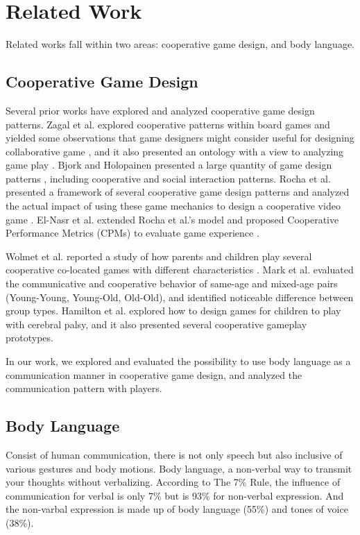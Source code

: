 \chapter{Related Work}
\label{c:related work}

Related works fall within two areas: cooperative game design, and body language.

\section{Cooperative Game Design}

Several prior works have explored and analyzed cooperative game design patterns. Zagal et al. explored cooperative patterns within board games and yielded some observations that game designers might consider useful for designing collaborative game \cite{CG1}, and it also presented an ontology with a view to analyzing game play \cite{CG3}. 
Bjork and Holopainen presented a large quantity of game design patterns \cite{CG2}, including cooperative and social interaction patterns.
Rocha et al. presented a framework of several cooperative game design patterns and analyzed the actual impact of using these game mechanics to design a cooperative video game \cite{CG4}.
El-Nasr et al. extended Rocha et al.'s model and proposed Cooperative Performance Metrics (CPMs) to evaluate game experience \cite{CPMs}.

Wolmet et al. reported a study of how parents and children play several cooperative co-located games with different characteristics \cite{CG5}. 
Mark et al. \cite{CG6} evaluated the communicative and cooperative behavior of same-age and mixed-age pairs (Young-Young, Young-Old, Old-Old), and identified noticeable difference between group types. 
Hamilton et al. \cite{CG7} explored how to design games for children to play with cerebral palsy, and it also presented several cooperative gameplay prototypes.

In our work, we explored and evaluated the possibility to use body language as a communication manner in cooperative game design, and analyzed the communication pattern with players.

\section{Body Language}

Consist of human communication, there is not only speech but also inclusive of various gestures and body motions. Body language, a non-verbal way to transmit your thoughts without verbalizing. According to The 7\% Rule\cite{GD2}, the influence of communication for verbal is only 7\% but is 93\% for non-verbal expression. And the non-varbal expression is made up of body language (55\%) and tones of voice (38\%).

